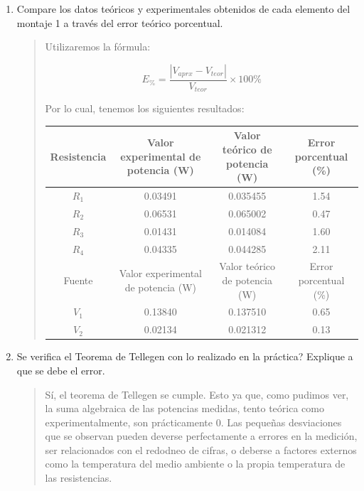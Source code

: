 \documentclass{article}
\begin{document}
\begin{enumerate}[label=\alph*.-]
        \item Compare los datos teóricos y experimentales obtenidos de cada elemento del montaje 1 a través del error teórico porcentual.
        
        \begin{quote}
            Utilizaremos la fórmula:

            \[
                E_{\%} = \frac{\left|V_{aprx} - V_{teor}\right|}{V_{teor}} \times 100\%
            \]

            Por lo cual, tenemos los siguientes resultados:
            
            \begin{table}[ht]
                \centering
                \begin{tabular}{|c|c|c|c|} %
                    \midrule 
                    Resistencia     & Valor experimental de potencia (\unit{\watt})   & Valor teórico de potencia (\unit{\watt})  & Error porcentual (\%)\\
                    \midrule
                    $R_1$           & 0.03491   & 0.035455  & 1.54  \\
                    $R_2$           & 0.06531   & 0.065002  & 0.47  \\
                    $R_3$           & 0.01431   & 0.014084  & 1.60  \\
                    $R_4$           & 0.04335   & 0.044285  & 2.11  \\
                    \midrule
                    Fuente          & Valor experimental de potencia (\unit{\watt})   & Valor teórico de potencia (\unit{\watt})  & Error porcentual (\%)\\
                    \midrule
                    $V_1$           & 0.13840   & 0.137510  & 0.65  \\
                    $V_2$           & 0.02134   & 0.021312  & 0.13  \\
                    \midrule
                \end{tabular}
            \end{table}

        \end{quote}
        
        \item Se verifica el Teorema de Tellegen con lo realizado en la práctica? Explique a que se debe el error.
        
        \begin{quote}
            Sí, el teorema de Tellegen se cumple. Esto ya que, como pudimos ver, la suma algebraica de las potencias medidas, tento teórica como experimentalmente, son prácticamente $0$. Las pequeñas desviaciones que se observan pueden deverse perfectamente a errores en la medición, ser relacionados con el redodneo de cifras, o deberse a factores externos como la temperatura del medio ambiente o la propia temperatura de las resistencias.
        \end{quote}
    \end{enumerate}
\end{document}
